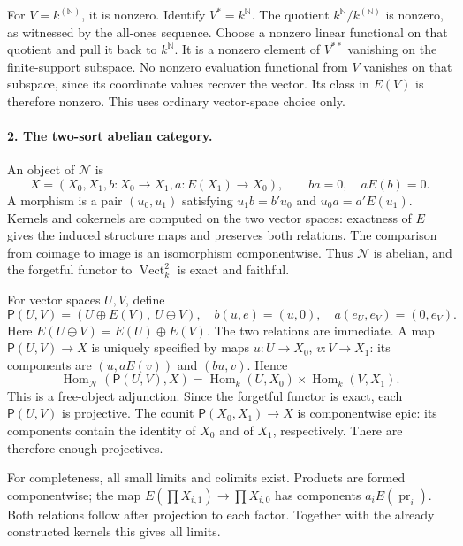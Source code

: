 For \(V=k^{(\mathbb N)}\), it is nonzero.  Identify
\(V^*=k^{\mathbb N}\).  The quotient
\(k^{\mathbb N}/k^{(\mathbb N)}\) is nonzero, as witnessed
by the all-ones sequence.  Choose a nonzero linear functional
on that quotient and pull it back to \(k^{\mathbb N}\).
It is a nonzero element of \(V^{**}\) vanishing on the
finite-support subspace.  No nonzero evaluation functional
from \(V\) vanishes on that subspace, since its coordinate
values recover the vector.  Its class in \(E(V)\) is therefore
nonzero.  This uses ordinary vector-space choice only.

\paragraph{2. The two-sort abelian category.}
An object of \(\mathcal N\) is
\[
 X=(X_0,X_1,b:X_0\to X_1,a:E(X_1)\to X_0),
                 \qquad ba=0,\quad aE(b)=0.                  \tag{SM34.1}
\]
A morphism is a pair \((u_0,u_1)\) satisfying
\(u_1b=b'u_0\) and \(u_0a=a'E(u_1)\).
Kernels and cokernels are computed on the two vector spaces:
exactness of \(E\) gives the induced structure maps and
preserves both relations.  The comparison from coimage to
image is an isomorphism componentwise.  Thus \(\mathcal N\)
is abelian, and the forgetful functor to
\(\operatorname{Vect}_k^2\) is exact and faithful.

For vector spaces \(U,V\), define
\[
 \mathsf P(U,V)=
       (U\oplus E(V),\ U\oplus V),
 \quad b(u,e)=(u,0),\quad a(e_U,e_V)=(0,e_V).                \tag{SM34.2}
\]
Here \(E(U\oplus V)=E(U)\oplus E(V)\).  The two relations
are immediate.  A map \(\mathsf P(U,V)\to X\) is uniquely
specified by maps \(u:U\to X_0\), \(v:V\to X_1\):
its components are
\((u,aE(v))\) and \((bu,v)\).  Hence
\[
 \operatorname{Hom}_{\mathcal N}(\mathsf P(U,V),X)
     =\operatorname{Hom}_k(U,X_0)\times\operatorname{Hom}_k(V,X_1).
                                                               \tag{SM34.3}
\]
This is a free-object adjunction.  Since the forgetful functor
is exact, each \(\mathsf P(U,V)\) is projective.  The counit
\(\mathsf P(X_0,X_1)\to X\) is componentwise epic: its
components contain the identity of \(X_0\) and of \(X_1\),
respectively.  There are therefore enough projectives.

For completeness, all small limits and colimits exist.
Products are formed componentwise; the map
\(E(\prod X_{i,1})\to\prod X_{i,0}\) has components
\(a_iE(\operatorname{pr}_i)\).  Both relations follow
after projection to each factor.  Together with the already
constructed kernels this gives all limits.

